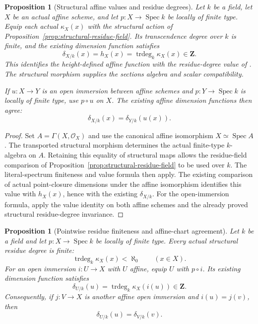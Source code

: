 \documentclass[11pt]{article}
\newtheorem{proposition}[theorem]{Proposition}
\theoremstyle{definition}
\theoremstyle{remark}
\DeclareMathOperator{\Spec}{Spec}
\begin{document}
\begin{proposition}[Structural affine values and residue degrees]
\label{prop:structural-affine-value}
Let \(k\) be a field, let \(X\) be an actual affine scheme, and let
\(p:X\to\Spec k\) be locally of finite type. Equip each actual
\(\kappa_X(x)\) with the structural action of
Proposition~\ref{prop:structural-residue-field}. Its transcendence
degree over \(k\) is finite, and the existing dimension function satisfies
\[
  \delta_{X/k}(x)=h_X(x)
    =\operatorname{trdeg}_k\kappa_X(x)\in\mathbf Z.
\]
This identifies the height-defined affine function with the residue-degree
value of \cite{StacksAlgebraicSchemeDimension}. The structural morphism
supplies the sections algebra and scalar compatibility.

If \(u:X\to Y\) is an open immersion between affine schemes and
\(p:Y\to\Spec k\) is locally of finite type, use \(p\circ u\)
on \(X\). The existing affine dimension functions then agree:
\[
  \delta_{X/k}(x)=\delta_{Y/k}(u(x)).
\]
\end{proposition}

\begin{proof}
Set \(A=\Gamma(X,\mathcal O_X)\) and use the canonical affine
isomorphism \(X\simeq\Spec A\). The transported structural morphism
determines the actual finite-type \(k\)-algebra on \(A\).
Retaining this equality of structural maps allows the residue-field
comparison of Proposition~\ref{prop:structural-residue-field} to be used
over \(k\). The literal-spectrum finiteness and value formula then apply.
The existing comparison of actual point-closure dimensions under the
affine isomorphism identifies this value with \(h_X(x)\), hence with
the existing \(\delta_{X/k}\).
For the open-immersion formula, apply the value identity on both affine
schemes and the already proved structural residue-degree invariance.
\end{proof}

\begin{proposition}[Pointwise residue finiteness and affine-chart agreement]
\label{prop:chart-residue-degree}
Let \(k\) be a field and let \(p:X\to\Spec k\) be locally of
finite type. Every actual structural residue degree is finite:
\[
  \operatorname{trdeg}_k\kappa_X(x)<\aleph_0
  \qquad(x\in X).
\]
For an open immersion \(i:U\to X\) with \(U\) affine, equip
\(U\) with \(p\circ i\). Its existing dimension function satisfies
\[
  \delta_{U/k}(u)
    =\operatorname{trdeg}_k\kappa_X(i(u))\in\mathbf Z.
\]
Consequently, if \(j:V\to X\) is another affine open immersion and
\(i(u)=j(v)\), then
\[
  \delta_{U/k}(u)=\delta_{V/k}(v).
\]
\end{proposition}
\end{document}
